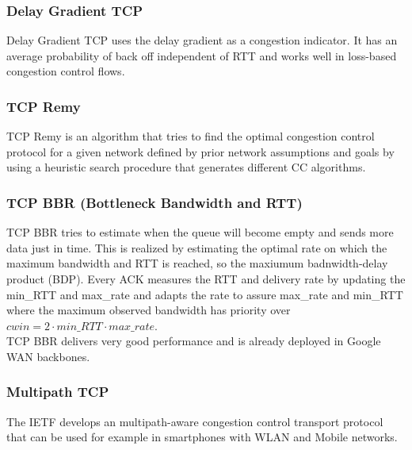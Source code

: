\subsubsection*{Delay Gradient TCP}
Delay Gradient TCP uses the delay gradient as a congestion indicator.
It has an average probability of back off independent of RTT and works well in loss-based congestion control flows.

\subsubsection*{TCP Remy}
TCP Remy is an algorithm that tries to find the optimal congestion control protocol for a given network defined by prior network assumptions and goals by using a heuristic search procedure that generates different CC algorithms.

\subsubsection*{TCP BBR (Bottleneck Bandwidth and RTT)}
TCP BBR tries to estimate when the queue will become empty and sends more data just in time.
This is realized by estimating the optimal rate on which the maximum bandwidth and RTT is reached, so the maxiumum badnwidth-delay product (BDP).
Every ACK measures the RTT and delivery rate by updating the min\_RTT and max\_rate and adapts the rate to assure max\_rate and min\_RTT where the maximum observed bandwidth has priority over $cwin = 2 \cdot min\_RTT \cdot max\_rate$.\\
TCP BBR delivers very good performance and is already deployed in Google WAN backbones.

\subsubsection*{Multipath TCP}
The IETF develops an multipath-aware congestion control transport protocol that can be used for example in smartphones with WLAN and Mobile networks.

